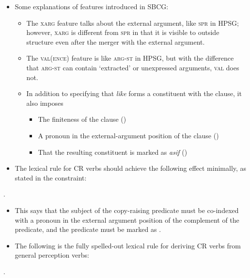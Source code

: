 \documentclass[11pt]{article}
\begin{document}
\begin{itemize}
\item Some explanations of features introduced in SBCG:
\begin{itemize}
    \item  The \textsc{xarg} feature talks about the external argument, like \textsc{spr} in HPSG; however, \textsc{xarg} is different from \textsc{spr} in that it is visible to outside structure even after the merger with the external argument.
\item The \textsc{val(ence)} feature is like \textsc{arg-st} in HPSG, but with the difference that \textsc{arg-st} can contain `extracted' or unexpressed arguments, \textsc{val} does not.
\item In addition to specifying that \emph{like} forms a constituent with the clause, it also imposes 
\begin{itemize}
    \item The finiteness of the clause ()
    \item A pronoun in the external-argument position of the clause (\avm{[xarg & NP]})
    \item That the resulting constituent is marked as \emph{asif} ()
\end{itemize}
\end{itemize}
\item The lexical rule for CR verbs should achieve the following effect minimally, as stated in the constraint:
\end{itemize}
\ex. 

\begin{itemize}
\item This says that the subject of the copy-raising predicate must be co-indexed with a pronoun in the external argument position of the complement of the predicate, and the predicate must be marked as .


\item The following is the fully spelled-out lexical rule for deriving CR verbs from general perception verbs:
\end{itemize}
\ex. 
\end{document}

